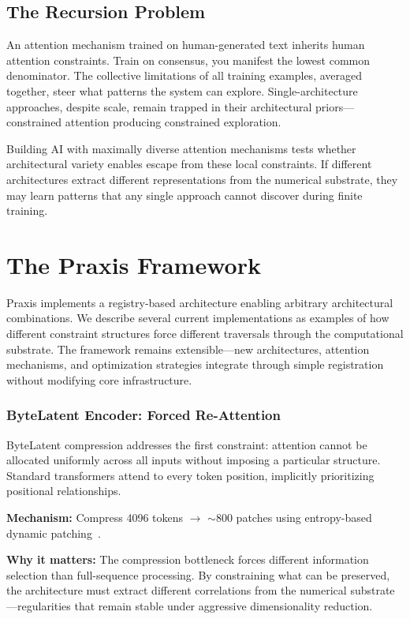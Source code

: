 \documentclass{article}
\begin{document}
\subsection{The Recursion Problem}

An attention mechanism trained on human-generated text inherits human attention constraints. Train on consensus, you manifest the lowest common denominator. The collective limitations of all training examples, averaged together, steer what patterns the system can explore. Single-architecture approaches, despite scale, remain trapped in their architectural priors—constrained attention producing constrained exploration.

Building AI with maximally diverse attention mechanisms tests whether architectural variety enables escape from these local constraints. If different architectures extract different representations from the numerical substrate, they may learn patterns that any single approach cannot discover during finite training.

\section{The Praxis Framework}

Praxis implements a registry-based architecture enabling arbitrary architectural combinations. We describe several current implementations as examples of how different constraint structures force different traversals through the computational substrate. The framework remains extensible—new architectures, attention mechanisms, and optimization strategies integrate through simple registration without modifying core infrastructure.

\subsubsection{ByteLatent Encoder: Forced Re-Attention}

ByteLatent compression addresses the first constraint: attention cannot be allocated uniformly across all inputs without imposing a particular structure. Standard transformers attend to every token position, implicitly prioritizing positional relationships.

\textbf{Mechanism:} Compress 4096 tokens $\rightarrow$ $\sim$800 patches using entropy-based dynamic patching~\cite{pagnoni2024byte}.

\textbf{Why it matters:} The compression bottleneck forces different information selection than full-sequence processing. By constraining what can be preserved, the architecture must extract different correlations from the numerical substrate—regularities that remain stable under aggressive dimensionality reduction.
\end{document}
